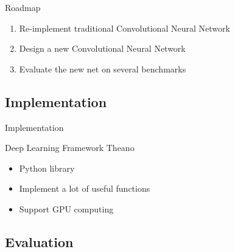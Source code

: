 \documentclass{beamer}
\begin{document}
  \begin{frame}{Roadmap}

    \begin{enumerate}
      \setlength\itemsep{1em}
      \item Re-implement traditional Convolutional Neural Network
      \item Design a new Convolutional Neural Network
      \item Evaluate the new net on several benchmarks
    \end{enumerate}
  \end{frame}

  \subsection{Implementation}

  \begin{frame}{Implementation}
    \begin{center}
      Deep Learning Framework Theano
    \end{center}

    \begin{itemize}
      \centering
      \setlength\itemsep{1em}
      \item Python library
      \item Implement a lot of useful functions
      \item Support GPU computing
    \end{itemize}
  \end{frame}

  \subsection{Evaluation}
\end{document}
